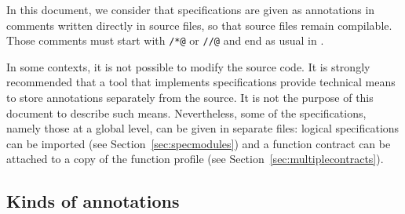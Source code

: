 In this document, we consider that specifications are given as
annotations in comments written directly in \lang source files, so that
source files remain compilable. Those comments must start with
\verb|/*@| or \verb|//@| and end as usual in \lang.

In some contexts, it is not possible to modify the source code.
It is strongly recommended that a tool that implements
\NAME specifications provide technical means to store annotations
separately from the source. It is not the purpose of this document
to describe such means.  Nevertheless, some of the specifications,
namely those at a global level, can be given in separate files:
logical specifications can be imported (see
Section~\ref{sec:specmodules}) and a function contract can be attached
to a copy of the function profile (see
Section~\ref{sec:multiplecontracts}).

\subsection{Kinds of annotations}

